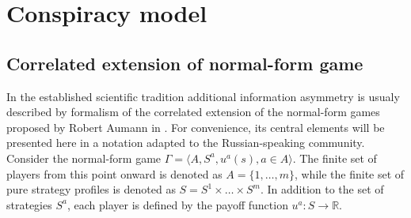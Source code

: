 \chapter{Conspiracy model}\label{ch:ch1}

\section{Correlated extension of normal-form game}\label{sec:ch1/sec1}

In the established scientific tradition additional information asymmetry is usualy described by formalism of the correlated extension of the normal-form games proposed by Robert Aumann in \cite{Aumann74}. For convenience, its central elements will be presented here in a notation adapted to the Russian-speaking community. Consider the normal-form game $\Gamma = \langle A, S^a, u^a(s), a \in A \rangle$. The finite set of players from this point onward is denoted as $A = \{1, \ldots, m\}$, while the finite set of pure strategy profiles is denoted as $S = S^1 \times \ldots \times S^m$. In addition to the set of strategies $S^a$, each player is defined by the payoff function $u^a : S \rightarrow \mathbb{R}$. %

